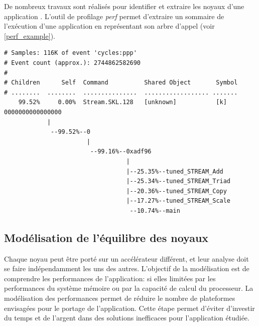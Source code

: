     
    De nombreux travaux sont réalisés pour identifier et extraire les noyaux d'une application \cite{castro2015cere, brunst2013custom}. L'outil de profilage \textit{perf} \cite{de2010new} permet d'extraire un sommaire de l'exécution d'une application en représentant son arbre d'appel (voir \autoref{perf_example}). 
    


\begin{lstlisting}[caption=Exemple d'utilisation de l'out perf avec la commande \textit{perf record  -g  -F 97}. Le rapport d'exécution est obtenu avec la commande \textit{perf report --stdio}, float,floatplacement=H, label={perf_example}]
# Samples: 116K of event 'cycles:ppp'
# Event count (approx.): 2744862582690
#
# Children      Self  Command          Shared Object       Symbol                                                                       
# ........  ........  ...............  .................. .......
    99.52%     0.00%  Stream.SKL.128   [unknown]           [k] 0000000000000000
            |          
             --99.52%--0
                       |          
                        --99.16%--0xadf96
                                  |
                                  |--25.35%--tuned_STREAM_Add   
                                  |--25.34%--tuned_STREAM_Triad
                                  |--20.36%--tuned_STREAM_Copy
                                  |--17.27%--tuned_STREAM_Scale
                                   --10.74%--main

\end{lstlisting}



\subsection{Modélisation de l'équilibre des noyaux}
    
    Chaque noyau peut être porté sur un accélérateur différent, et leur analyse doit se faire indépendamment les uns des autres. L'objectif de la modélisation est de comprendre les performances de l'application: si elles limitées par les performances du système mémoire ou par la capacité de calcul du processeur. La modélisation des performances permet de réduire le nombre de plateformes envisagées pour le portage de l'application. Cette étape permet d'éviter d'investir du temps et de l'argent dans des solutions inefficaces pour l'application étudiée. 
    
